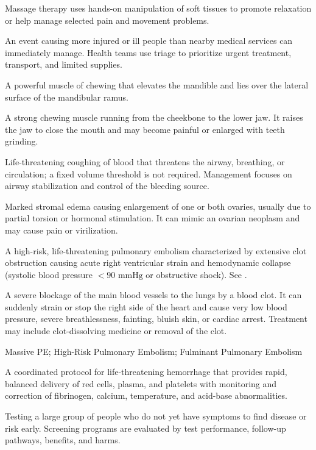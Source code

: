  Massage therapy uses hands-on manipulation of soft tissues to promote relaxation or help manage selected pain and movement problems.

 An event causing more injured or ill people than nearby medical services can immediately manage. Health teams use triage to prioritize urgent treatment, transport, and limited supplies.

 A powerful muscle of chewing that elevates the mandible and lies over the lateral surface of the mandibular ramus.

 A strong chewing muscle running from the cheekbone to the lower jaw. It raises the jaw to close the mouth and may become painful or enlarged with teeth grinding.

 Life-threatening coughing of blood that threatens the airway, breathing, or circulation; a fixed
volume threshold is not required. Management focuses on airway stabilization and control
of the bleeding source.

 Marked stromal edema causing enlargement of one or both ovaries, usually due to partial torsion or hormonal stimulation. It can mimic an ovarian neoplasm and may cause pain or virilization.

 A high-risk, life-threatening pulmonary embolism characterized by extensive clot obstruction causing acute right ventricular strain and hemodynamic collapse (systolic blood pressure $< 90\text{ mmHg}$ or obstructive shock). See .

 A severe blockage of the main blood vessels to the lungs by a blood clot. It can suddenly strain or stop the right side of the heart and cause very low blood pressure, severe breathlessness, fainting, bluish skin, or cardiac arrest. Treatment may include clot-dissolving medicine or removal of the clot.

\synonyms
Massive PE; High-Risk Pulmonary Embolism; Fulminant Pulmonary Embolism

 A coordinated protocol for life-threatening hemorrhage that provides rapid, balanced
delivery of red cells, plasma, and platelets with monitoring and correction of
fibrinogen, calcium, temperature, and acid-base abnormalities.

 Testing a large group of people who do not yet have symptoms to find disease or risk early. Screening programs are evaluated by test performance, follow-up pathways, benefits, and harms.

